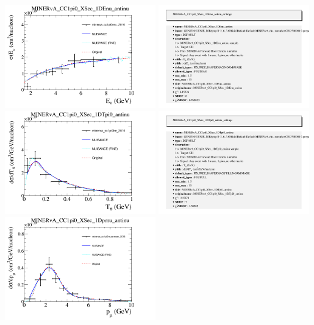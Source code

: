 \documentclass{article}
\begin{document}
\centering
\includegraphics[width=0.49\textwidth]{figures/minerva_cc1pi0enu_2016_comp.png}
\includegraphics[width=0.49\textwidth]{figures/minerva_cc1pi0enu_2016_info.png}
\centering
\includegraphics[width=0.49\textwidth]{figures/minerva_cc1pi0ke_2016_comp.png}
\includegraphics[width=0.49\textwidth]{figures/minerva_cc1pi0ke_2016_info.png}
\centering
\includegraphics[width=0.49\textwidth]{figures/minerva_cc1pi0muonmom_2016_comp.png}
\end{document}
